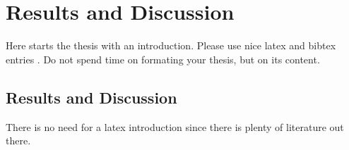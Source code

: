 \chapter{Results and Discussion}
\label{chapter:Results and Discussion}



Here starts the thesis with an introduction. Please use nice latex and bibtex entries \cite{latex}. Do not spend time on formating your thesis, but on its content. 
 
\section{Results and Discussion}
There is no need for a latex introduction since there is plenty of literature out there.
 



